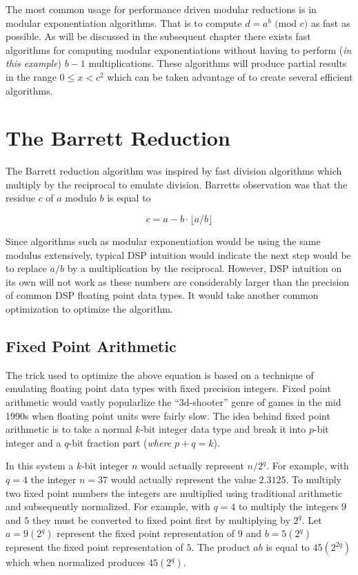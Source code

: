 \documentclass[b5paper]{book}
\begin{document}
The most common usage for performance driven modular reductions is in modular exponentiation algorithms.  That is to compute 
$d = a^b \mbox{ (mod }c\mbox{)}$ as fast as possible.  As will be discussed in the subsequent chapter there exists fast algorithms for computing
modular exponentiations without having to perform (\textit{in this example}) $b - 1$ multiplications.  These algorithms will produce partial
results in the range $0 \le x < c^2$ which can be taken advantage of to create several efficient algorithms.

\section{The Barrett Reduction}
The Barrett reduction algorithm \cite{BARRETT} was inspired by fast division algorithms which multiply by the reciprocal to emulate
division.  Barretts observation was that the residue $c$ of $a$ modulo $b$ is equal to 

\begin{equation}
c = a - b \cdot \lfloor a/b \rfloor
\end{equation}

Since algorithms such as modular exponentiation would be using the same modulus extensively, typical DSP intuition would indicate the next step 
would be to replace $a/b$ by a multiplication by the reciprocal.  However, DSP intuition on its own will not work as these numbers are considerably
larger than the precision of common DSP floating point data types.  It would take another common optimization to optimize the algorithm.

\subsection{Fixed Point Arithmetic}
The trick used to optimize the above equation is based on a technique of emulating floating point data types with fixed precision integers.  Fixed
point arithmetic would vastly popularlize the ``3d-shooter'' genre of games in the mid 1990s when floating point units were fairly slow.  The idea behind
fixed point arithmetic is to take a normal $k$-bit integer data type and break it into $p$-bit integer and a $q$-bit fraction part 
(\textit{where $p+q = k$}).  

In this system a $k$-bit integer $n$ would actually represent $n/2^q$.  For example, with $q = 4$ the integer $n = 37$ would actually represent the
value $2.3125$.  To multiply two fixed point numbers the integers are multiplied using traditional arithmetic and subsequently normalized. For example, 
with $q = 4$ to multiply the integers $9$ and $5$ they must be converted to fixed point first by multiplying by $2^q$.  Let $a = 9(2^q)$ 
represent the fixed point representation of $9$ and $b = 5(2^q)$ represent the fixed point representation of $5$.  The product $ab$ is equal to
$45(2^{2q})$ which when normalized produces $45(2^q)$.  
\end{document}
